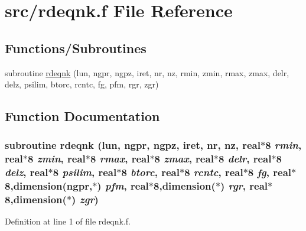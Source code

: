 \hypertarget{rdeqnk_8f}{
\section{src/rdeqnk.f File Reference}
\label{rdeqnk_8f}
}
\subsection*{Functions/Subroutines}
\begin{CompactItemize}
\item 
subroutine \hyperlink{rdeqnk_8f_ba19599ccdbf1eedf102dc17a2d864fd}{rdeqnk} (lun, ngpr, ngpz, iret, nr, nz, rmin, zmin, rmax, zmax, delr, delz, psilim, btorc, rcntc, fg, pfm, rgr, zgr)
\end{CompactItemize}


\subsection{Function Documentation}
\hypertarget{rdeqnk_8f_ba19599ccdbf1eedf102dc17a2d864fd}{
\subsubsection[rdeqnk]{\setlength{\rightskip}{0pt plus 5cm}subroutine rdeqnk (lun, \/  ngpr, \/  ngpz, \/  iret, \/  nr, \/  nz, \/  real$\ast$8 {\em rmin}, \/  real$\ast$8 {\em zmin}, \/  real$\ast$8 {\em rmax}, \/  real$\ast$8 {\em zmax}, \/  real$\ast$8 {\em delr}, \/  real$\ast$8 {\em delz}, \/  real$\ast$8 {\em psilim}, \/  real$\ast$8 {\em btorc}, \/  real$\ast$8 {\em rcntc}, \/  real$\ast$8 {\em fg}, \/  real$\ast$8,dimension(ngpr,$\ast$) {\em pfm}, \/  real$\ast$8,dimension($\ast$) {\em rgr}, \/  real$\ast$8,dimension($\ast$) {\em zgr})}}
\label{rdeqnk_8f_ba19599ccdbf1eedf102dc17a2d864fd}




Definition at line 1 of file rdeqnk.f.